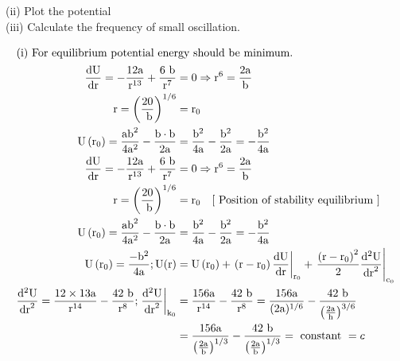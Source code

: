 \begin{enumerate}
(ii) Plot the potential\\
(iii) Calculate the frequency of small oscillation.\\
	\begin{answer}
		\begin{align*}
		\intertext{(i) For equilibrium potential energy should be minimum.}
		\frac{\mathrm{dU}}{\mathrm{dr}}=-\frac{12 \mathrm{a}}{\mathrm{r}^{13}}+\frac{6 \mathrm{~b}}{\mathrm{r}^{7}}&=0 \Rightarrow \mathrm{r}^{6}=\frac{2 \mathrm{a}}{\mathrm{b}} \\
		\mathrm{r}=\left(\frac{20}{\mathrm{~b}}\right)^{1 / 6}&=\mathrm{r}_{0} \\
		\mathrm{U}\left(\mathrm{r}_{0}\right)=\frac{\mathrm{ab}^{2}}{4 \mathrm{a}^{2}}-\frac{\mathrm{b} \cdot \mathrm{b}}{2 \mathrm{a}}&=\frac{\mathrm{b}^{2}}{4 \mathrm{a}}-\frac{\mathrm{b}^{2}}{2 \mathrm{a}}=-\frac{\mathrm{b}^{2}}{4 \mathrm{a}}\\
		\frac{\mathrm{dU}}{\mathrm{dr}}=-\frac{12 \mathrm{a}}{\mathrm{r}^{13}}+\frac{6 \mathrm{~b}}{\mathrm{r}^{7}}&=0 \Rightarrow \mathrm{r}^{6}=\frac{2 \mathrm{a}}{\mathrm{b}}\\ \mathrm{r}=\left(\frac{20}{\mathrm{~b}}\right)^{1 / 6}&=\mathrm{r}_{0} \quad[\text{ Position of stability equilibrium }]\\ \mathrm{U}\left(\mathrm{r}_{0}\right)=\frac{\mathrm{ab}^{2}}{4 \mathrm{a}^{2}}-\frac{\mathrm{b} \cdot \mathrm{b}}{2 \mathrm{a}}&=\frac{\mathrm{b}^{2}}{4 \mathrm{a}}-\frac{\mathrm{b}^{2}}{2 \mathrm{a}}=-\frac{\mathrm{b}^{2}}{4 \mathrm{a}}\\
		\mathrm{U}\left(\mathrm{r}_{0}\right)=\frac{-\mathrm{b}^{2}}{4 \mathrm{a}} ; \mathrm{U}(\mathrm{r})&=\mathrm{U}\left(\mathrm{r}_{0}\right)+\left.\left(\mathrm{r}-\mathrm{r}_{0}\right) \frac{\mathrm{dU}}{\mathrm{dr}}\right|_{\mathrm{r}_{0}}+\left.\frac{\left(\mathrm{r}-\mathrm{r}_{0}\right)^{2}}{2} \frac{\mathrm{d}^{2} \mathrm{U}}{\mathrm{dr}^{2}}\right|_{\mathrm{c}_{0}}\\
		\frac{\mathrm{d}^{2} \mathrm{U}}{\mathrm{dr}^{2}}=\frac{12 \times 13 \mathrm{a}}{\mathrm{r}^{14}}-\frac{42 \mathrm{~b}}{\mathrm{r}^{8}} ;\left.\frac{\mathrm{d}^{2} \mathrm{U}}{\mathrm{dr}^{2}}\right|_{\mathrm{k}_{0}}&=\frac{156 \mathrm{a}}{\mathrm{r}^{14}}-\frac{42 \mathrm{~b}}{\mathrm{r}^{8}}=\frac{156 \mathrm{a}}{(2 \mathrm{a})^{1 / 6}}-\frac{42 \mathrm{~b}}{\left(\frac{2 \mathrm{a}}{\mathrm{h}}\right)^{3 / 6}}\\
		&=\frac{156 \mathrm{a}}{\left(\frac{2 \mathrm{a}}{\mathrm{b}}\right)^{1 / 3}}-\frac{42 \mathrm{~b}}{\left(\frac{2 \mathrm{a}}{\mathrm{b}}\right)^{1 / 3}}=\text { constant }=c\\

\end{align*}
\end{answer}
\end{enumerate}
